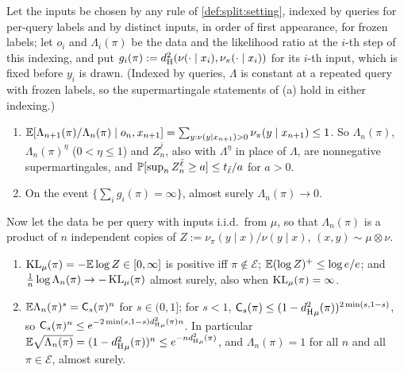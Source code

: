 \begin{lemma}\label{lem:recovery:ratios}
Let the inputs be chosen by any rule of \cref{def:split:setting}, indexed by queries for per-query labels and by distinct inputs, in order of first appearance, for frozen labels; let $o_i$ and $\Lambda_i(\pi)$ be the data and the likelihood ratio at the $i$-th step of this indexing, and put $g_i(\pi):=d_{\mathrm{H}}^{2}(\nu(\cdot\mid x_i),\nu_\pi(\cdot\mid x_i))$ for its $i$-th input, which is fixed before $y_i$ is drawn. (Indexed by queries, $\Lambda$ is constant at a repeated query with frozen labels, so the supermartingale statements of (a) hold in either indexing.)
\begin{enumerate}[label=(\alph*),itemsep=1pt,topsep=2pt]
\item $\mathbb{E}[\Lambda_{n+1}(\pi)/\Lambda_n(\pi)\mid o_n,x_{n+1}]=\sum_{y:\nu(y\mid x_{n+1})>0}\nu_\pi(y\mid x_{n+1})\le1$. So $\Lambda_n(\pi)$, $\Lambda_n(\pi)^\eta$ ($0<\eta\le1$) and $Z^{\bar\ell}_n$, also with $\Lambda^\eta$ in place of $\Lambda$, are nonnegative supermartingales, and $\mathbb{P}[\sup_nZ^{\bar\ell}_n\ge a]\le t_{\bar\ell}/a$ for $a>0$.
\item On the event $\{\sum_ig_i(\pi)=\infty\}$, almost surely $\Lambda_n(\pi)\to0$.
\end{enumerate}
Now let the data be per query with inputs i.i.d.\ from $\mu$, so that $\Lambda_n(\pi)$ is a product of $n$ independent copies of $Z:=\nu_\pi(y\mid x)/\nu(y\mid x)$, $(x,y)\sim\mu\otimes\nu$.
\begin{enumerate}[label=(\alph*),resume,itemsep=1pt,topsep=2pt]
\item $\operatorname{KL}_\mu(\pi)=-\mathbb{E}\log Z\in[0,\infty]$ is positive iff $\pi\notin\mathcal E$; $\mathbb{E}(\log Z)^+\le\log e/e$; and $\frac1n\log\Lambda_n(\pi)\to-\operatorname{KL}_\mu(\pi)$ almost surely, also when $\operatorname{KL}_\mu(\pi)=\infty$.
\item $\mathbb{E}\Lambda_n(\pi)^s=\mathsf C_s(\pi)^n$ for $s\in(0,1]$; for $s<1$, $\mathsf C_s(\pi)\le(1-{d_{\mathrm{H}}^{2}}_\mu(\pi))^{2\min(s,1-s)}$, so $\mathsf C_s(\pi)^n\le e^{-2\min(s,1-s){d_{\mathrm{H}}^{2}}_\mu(\pi)n}$. In particular $\mathbb{E}\sqrt{\Lambda_n(\pi)}=(1-{d_{\mathrm{H}}^{2}}_\mu(\pi))^n\le e^{-n{d_{\mathrm{H}}^{2}}_\mu(\pi)}$, and $\Lambda_n(\pi)=1$ for all $n$ and all $\pi\in\mathcal E$, almost surely.
\end{enumerate}
\end{lemma}

